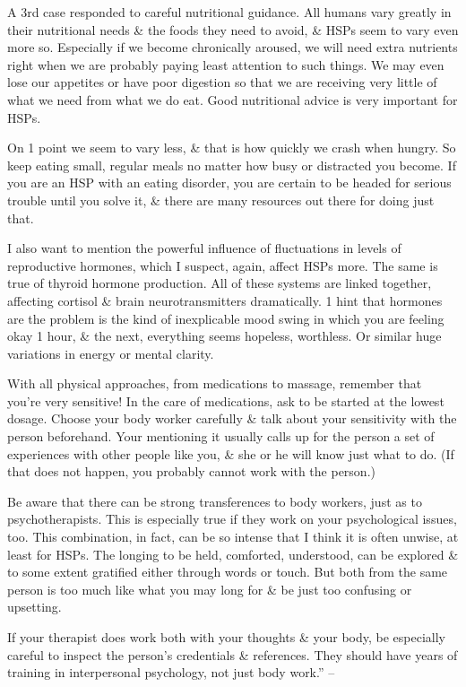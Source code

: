 \documentclass{article}
\numberwithin{equation}{section}
\begin{document}
A 3rd case responded to careful nutritional guidance. All humans vary greatly in their nutritional needs \& the foods they need to avoid, \& HSPs seem to vary even more so. Especially if we become chronically aroused, we will need extra nutrients right when we are probably paying least attention to such things. We may even lose our appetites or have poor digestion so that we are receiving very little of what we need from what we do eat. Good nutritional advice is very important for HSPs.

On 1 point we seem to vary less, \& that is how quickly we crash when hungry. So keep eating small, regular meals no matter how busy or distracted you become. If you are an HSP with an eating disorder, you are certain to be headed for serious trouble until you solve it, \& there are many resources out there for doing just that.

I also want to mention the powerful influence of fluctuations in levels of reproductive hormones, which I suspect, again, affect HSPs more. The same is true of thyroid hormone production. All of these systems are linked together, affecting cortisol \& brain neurotransmitters dramatically. 1 hint that hormones are the problem is the kind of inexplicable mood swing in which you are feeling okay 1 hour, \& the next, everything seems hopeless, worthless. Or similar huge variations in energy or mental clarity.

With all physical approaches, from medications to massage, remember that you're very sensitive! In the care of medications, ask to be started at the lowest dosage. Choose your body worker carefully \& talk about your sensitivity with the person beforehand. Your mentioning it usually calls up for the person a set of experiences with other people like you, \& she or he will know just what to do. (If that does not happen, you probably cannot work with the person.)

Be aware that there can be strong transferences to body workers, just as to psychotherapists. This is especially true if they work on your psychological issues, too. This combination, in fact, can be so intense that I think it is often unwise, at least for HSPs. The longing to be held, comforted, understood, can be explored \& to some extent gratified either through words or touch. But both from the same person is too much like what you may long for \& be just too confusing or upsetting.

If your therapist does work both with your thoughts \& your body, be especially careful to inspect the person's credentials \& references. They should have years of training in interpersonal psychology, not just body work.'' -- \cite[pp. 211--212]{Aron2013}
\end{document}
